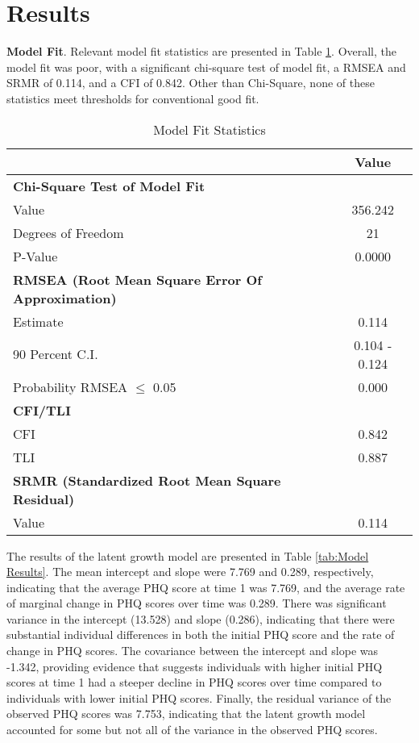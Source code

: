 \documentclass[11pt]{article}
\begin{document}
\section{Results}

\textbf{Model Fit}. Relevant model fit statistics are presented in Table \ref{tab:Model Fit}. Overall, the model fit was poor, with a significant chi-square test of model fit, a RMSEA and SRMR of 0.114, and a CFI of 0.842. Other than Chi-Square, none of these statistics meet thresholds for conventional good fit. 

\begin{table}[htbp!]
    \centering
    \caption{Model Fit Statistics} \label{tab:Model Fit}
    \begin{tabular}{l c}
    \toprule
    & \textbf{Value} \\
    \midrule
    \textbf{Chi-Square Test of Model Fit} & \\
    Value & 356.242 \\
    Degrees of Freedom & 21 \\
    P-Value & 0.0000 \\
    \midrule
    \textbf{RMSEA (Root Mean Square Error Of Approximation)} & \\
    Estimate & 0.114 \\
    90 Percent C.I. & 0.104 - 0.124 \\
    Probability RMSEA $\leq$ 0.05 & 0.000 \\
    \midrule
    \textbf{CFI/TLI} & \\
    CFI & 0.842 \\
    TLI & 0.887 \\
    \midrule
    \textbf{SRMR (Standardized Root Mean Square Residual)} & \\
    Value & 0.114 \\
    \bottomrule
    \end{tabular}
\end{table}

The results of the latent growth model are presented in Table \ref{tab:Model Results}. 
The mean intercept and slope were 7.769 and 0.289, respectively, indicating that the average PHQ score at time 1 was 7.769, and the average rate of marginal change in PHQ scores over time was 0.289. 
There was significant variance in the intercept (13.528) and slope (0.286), indicating that there were substantial individual differences in both the initial PHQ score and the rate of change in PHQ scores. 
The covariance between the intercept and slope was -1.342, providing evidence that suggests individuals with higher initial PHQ scores at time 1 had a steeper decline in PHQ scores over time compared to individuals with lower initial PHQ scores.
Finally, the residual variance of the observed PHQ scores was 7.753, indicating that the latent growth model accounted for some but not all of the variance in the observed PHQ scores.
\end{document}
